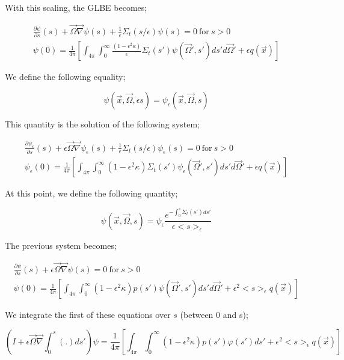 \documentclass[a4paper, 12pt]{report}
\newcommand{\bl}{\big<}
\newcommand{\bg}{\big>}
\begin{document}
\begin{appendix}
With this scaling, the GLBE becomes;

\begin{align}
\frac{\partial \psi}{\partial s} (s) + \vec{\Omega}\vec{\nabla}\psi(s) + \frac{1}{\epsilon}\Sigma_t(s/\epsilon)\psi(s)=0 \ \text{for} \ s>0 \\
\psi(0) = \frac{1}{4\pi}\left[  \int_{4\pi} \int_0^\infty \frac{(1-\epsilon^2 \kappa)}{\epsilon}\Sigma_t(s')\psi(\vec{\Omega}',s')ds'd\vec{\Omega}' + \epsilon q(\vec{x}) \right]
\end{align}

We define the following equality;

\begin{equation}
\psi(\vec{x},\vec{\Omega},\epsilon s) = \psi_\epsilon(\vec{x},\vec{\Omega},s)
\end{equation}

This quantity is the solution of the following system;

\begin{align}
\frac{\partial \psi_\epsilon}{\partial s} (s) + \epsilon \vec{\Omega}\vec{\nabla}\psi_\epsilon(s) + \frac{1}{\epsilon}\Sigma_t(s/\epsilon)\psi_\epsilon(s)=0 \ \text{for} \ s>0 \\
\psi_\epsilon(0) = \frac{1}{4\pi}\left[  \int_{4\pi} \int_0^\infty (1-\epsilon^2 \kappa)\Sigma_t(s')\psi_\epsilon(\vec{\Omega}',s')ds'd\vec{\Omega}' + \epsilon q(\vec{x}) \right]
\end{align}

At this point, we define the following quantity;

\begin{equation}
\psi(\vec{x},\vec{\Omega},s) = \psi_\epsilon \frac{e^{-\int_0^s \Sigma_t(s')ds'}}{\epsilon \bl s\bg_\epsilon}
\end{equation}

The previous system becomes;

\begin{align}
\frac{\partial \psi}{\partial s} (s) + \epsilon \vec{\Omega}\vec{\nabla}\psi(s)=0 \ \text{for} \ s>0 \\
\psi(0) = \frac{1}{4\pi}\left[  \int_{4\pi} \int_0^\infty (1-\epsilon^2 \kappa)p(s')\psi(\vec{\Omega}',s')ds'd\vec{\Omega}' + \epsilon^2 \bl s \bg_\epsilon q(\vec{x}) \right]
\end{align}

We integrate the first of these equations over $s$ (between 0 and s);

\begin{equation}
\left( I + \epsilon \vec{\Omega} \vec{\nabla} \int_0^s (.) ds' \right)\psi = \frac{1}{4\pi} \left[  \int_{4\pi} \int_0^\infty (1-\epsilon^2 \kappa)p(s')\varphi(s')ds' + \epsilon^2 \bl s \bg_\epsilon q(\vec{x}) \right]
\end{equation}


\end{appendix}
\end{document}

